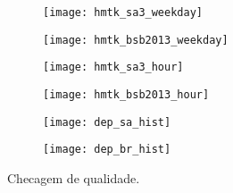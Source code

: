 \begin{figure}[H]
	\centering
	\begin{subfigure}[b]{0.45\textwidth}
		  	\centering
			\texttt{[image: hmtk\_sa3\_weekday]}
			\label{fig:sa_week_hist}
	\end{subfigure}%
	\quad %
	\begin{subfigure}[b]{0.45\textwidth}
		  	\centering
			\texttt{[image: hmtk\_bsb2013\_weekday]}
			\label{fig:br_week_hist}
    \end{subfigure}%
          
 	\begin{subfigure}[b]{0.45\textwidth}
		  	\centering
			\texttt{[image: hmtk\_sa3\_hour]}
			\label{fig:sa_hour_hist}
	\end{subfigure}%
	\quad %
	\begin{subfigure}[b]{0.45\textwidth}
		  	\centering
			\texttt{[image: hmtk\_bsb2013\_hour]}
			\label{fig:br_hour_hist}
    \end{subfigure}%

	\begin{subfigure}[b]{0.45\textwidth}
		  	\centering
			\texttt{[image: dep\_sa\_hist]}
			\label{fig:sa_dep_hist}
	\end{subfigure}%
	\quad %
	\begin{subfigure}[b]{0.4\textwidth}
		  	\centering
			\texttt{[image: dep\_br\_hist]}
			\label{fig:br_dep_hist}
        \end{subfigure}%

  \caption{Checagem de qualidade.}
  \label{fig:qc_histograms} 
\end{figure}

